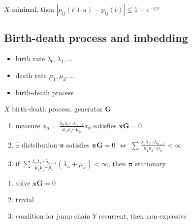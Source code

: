 \begin{lemma}
    $X$ minimal, then $|p_{ij}(t + u) - p_{ij}(t)| \leq 1 - e^{-g_{i}u}$
\end{lemma}

\subsection{Birth-death process and imbedding}\label{subsec:birth-death-process-and-imbedding}

\begin{itemize}
    \item birth rate $\lambda_0, \lambda_1, \dots$
    \item death rate $\mu_{1}, \mu_2, \dots$
    \item birth-death process
\end{itemize}

\begin{thm}
    $X$ birth-death process, generator $\bm G$
    \begin{enumerate}
        \item measure $x_n = \frac{\lambda_0\lambda_1 \cdots \lambda_{n-1}}{\mu_1\mu_2\cdots\mu_n}x_0$ satisfies $\bm x \bm G = 0$
        \item $\exists$ distribution $\bm\pi$ satisfies $\bm \pi \bm G = 0$ $\iff$ $\sum \frac{\lambda_0\lambda_1 \cdots \lambda_{n-1}}{\mu_1\mu_2\cdots\mu_n}< \infty$
        \item if $\sum \frac{\lambda_0\lambda_1 \cdots \lambda_{n-1}}{\mu_1\mu_2\cdots\mu_n} (\lambda_n + \mu_n) < \infty$, then $\bm \pi$ stationary
    \end{enumerate}
\end{thm}
\begin{pf}
    \begin{enumerate}
        \item solve $\bm x \bm G =0$
        \item trivial
        \item condition for jump chain $Y$ recurrent, then non-explosive
    \end{enumerate}
\end{pf}

